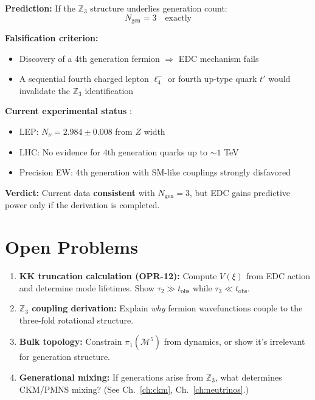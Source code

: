 \begin{tcolorbox}[edcCanonical, title=\textbf{Falsifiability Statement}]
\textbf{Prediction:} If the $\mathbb{Z}_3$ structure underlies generation count:
\begin{equation}
    N_{\text{gen}} = 3 \quad \text{exactly}
\end{equation}

\textbf{Falsification criterion:}
\begin{itemize}[nosep]
    \item Discovery of a 4th generation fermion $\Longrightarrow$ EDC mechanism fails
    \item A sequential fourth charged lepton $\ell_4^-$ or fourth up-type quark $t'$
          would invalidate the $\mathbb{Z}_3$ identification
\end{itemize}

\textbf{Current experimental status} \tagBL{}:
\begin{itemize}[nosep]
    \item LEP: $N_\nu = 2.984 \pm 0.008$ from $Z$ width
    \item LHC: No evidence for 4th generation quarks up to $\sim 1$ TeV
    \item Precision EW: 4th generation with SM-like couplings strongly disfavored
\end{itemize}

\textbf{Verdict:} Current data \textbf{consistent} with $N_{\text{gen}} = 3$, but
EDC gains predictive power only if the derivation is completed.
\end{tcolorbox}

\section{Open Problems}
\label{sec:gen_open}

\begin{enumerate}
    \item \textbf{KK truncation calculation (OPR-12):} Compute $V(\xi)$ from EDC action
          and determine mode lifetimes. Show $\tau_2 \gg t_{\text{obs}}$ while
          $\tau_3 \ll t_{\text{obs}}$.

    \item \textbf{$\mathbb{Z}_3$ coupling derivation:} Explain \emph{why} fermion
          wavefunctions couple to the three-fold rotational structure.

    \item \textbf{Bulk topology:} Constrain $\pi_1(\mathcal{M}^5)$ from dynamics,
          or show it's irrelevant for generation structure.

    \item \textbf{Generational mixing:} If generations arise from $\mathbb{Z}_3$,
          what determines CKM/PMNS mixing? (See Ch.~\ref{ch:ckm}, Ch.~\ref{ch:neutrinos}.)
\end{enumerate}

